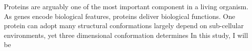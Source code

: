 Proteins are arguably one of the most important component in a living organism. As genes encode biological features, proteins deliver biological functions. One protein can adopt many structural conformations largely depend on sub-cellular environments, yet three dimensional conformation determines    In this study, I will be 